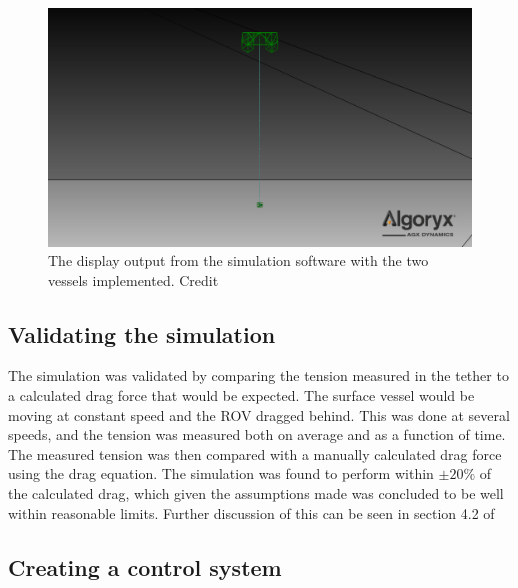 \documentclass[class=article, crop=false, draft=true]{standalone}
\begin{document}
\begin{figure}
    \centering
    \includegraphics{sim-display}
    \caption{The display output from the simulation software with the two vessels implemented. Credit \cite{specialization}}
    \label{fig:display}
\end{figure}

\subsection{Validating the simulation}
The simulation was validated by comparing the tension measured in the tether to a calculated drag force that would be expected. The surface vessel would be moving at constant speed and the ROV dragged behind. This was done at several speeds, and the tension was measured both on average and as a function of time. The measured tension was then compared with a manually calculated drag force using the drag equation. The simulation was found to perform within \(\pm 20\%\) of the calculated drag, which given the assumptions made was concluded to be well within reasonable limits. Further discussion of this can be seen in section 4.2 of \citet{specialization}

\subsection{Creating a control system}
\end{document}
